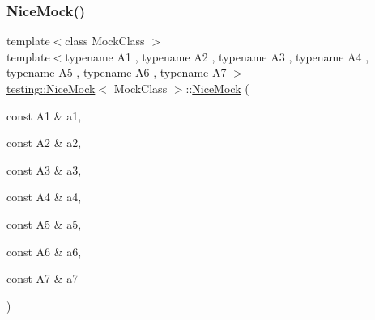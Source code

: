 \mbox{\label{classtesting_1_1_nice_mock_a946d75ece1fa3a066b7d9d6ab7828c55}} 
\subsubsection{\texorpdfstring{Nice\+Mock()}{NiceMock()}\hspace{0.1cm}{\footnotesize\ttfamily [8/11]}}
{\footnotesize\ttfamily template$<$class Mock\+Class $>$ \\
template$<$typename A1 , typename A2 , typename A3 , typename A4 , typename A5 , typename A6 , typename A7 $>$ \\
\hyperlink{classtesting_1_1_nice_mock}{testing\+::\+Nice\+Mock}$<$ Mock\+Class $>$\+::\hyperlink{classtesting_1_1_nice_mock}{Nice\+Mock} (\begin{DoxyParamCaption}\item[{const A1 \&}]{a1,  }\item[{const A2 \&}]{a2,  }\item[{const A3 \&}]{a3,  }\item[{const A4 \&}]{a4,  }\item[{const A5 \&}]{a5,  }\item[{const A6 \&}]{a6,  }\item[{const A7 \&}]{a7 }\end{DoxyParamCaption})\hspace{0.3cm}{\ttfamily [inline]}}

\mbox{\label{classtesting_1_1_nice_mock_ae8792aab6c024a50886856bf1093eedc}} 
